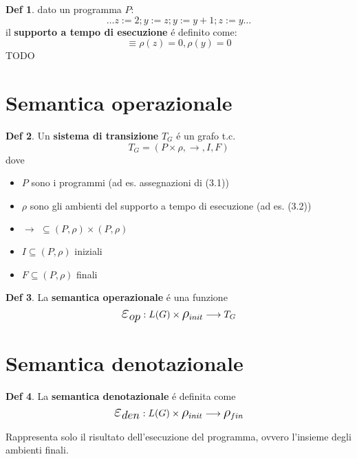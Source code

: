 \documentclass[a4paper]{report}
\theoremstyle{definition} \newtheorem*{defi}{Def}
\theoremstyle{plain} \newtheorem{lemma}{Lemma}
\theoremstyle{plain} \newtheorem{teo}{Teorema}
\theoremstyle{remark} \newtheorem*{es}{Esempio}
\begin{document}
\begin{defi} dato un programma $P$:
\begin{equation}
{\ldots}z:=2; y:=z; y:=y+1; z:=y{\ldots}
\end{equation}
il {\bf supporto a tempo di esecuzione} \'e definito come:
\begin{equation}
[z=0, y=0] \equiv \rho(z) = 0, \rho(y) = 0
\end{equation}
TODO
\end{defi}
\newpage
\section{Semantica operazionale}
\begin{defi}
Un {\bf sistema di transizione} $T_G$ \'e un grafo t.c.
$$
T_G = ( P \times \rho , \longrightarrow , I , F  )
$$
dove
\begin{itemize}
\item $P$ sono i programmi (ad es. assegnazioni di (3.1))
\item $\rho$ sono gli ambienti del supporto a tempo di esecuzione (ad es. (3.2))
\item $ \longrightarrow \, \, \subseteq ( P , \rho ) \times ( P , \rho ) $
\item $ I \subseteq ( P,\rho)$ iniziali
\item $ F \subseteq (P, \rho)$ finali
\end{itemize}
\end{defi}

\begin{defi}
La {\bf semantica operazionale} \'e una funzione
$$
\mathlarger{\mathlarger{\mathlarger{\varepsilon_{op}}}} : L(G) \times \mathlarger{\mathlarger{\rho}}_{init} \longrightarrow T_G
$$
\end{defi}

\section{Semantica denotazionale}
\begin{defi}
La {\bf semantica denotazionale} \'e definita come
$$
\mathlarger{\mathlarger{\mathlarger{\varepsilon_{den}}}} : L(G) \times \mathlarger{\mathlarger{\rho}}_{init} \longrightarrow \mathlarger{\mathlarger{\rho}}_{fin}
$$
\end{defi}
Rappresenta solo il risultato dell'esecuzione del programma, ovvero l'insieme degli ambienti finali.
\end{document}
